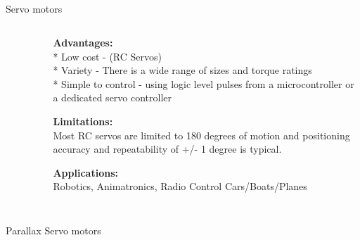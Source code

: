 \subsection{}
{
\begin{frame}{Servo motors}

\begin{columns}
\begin{column}{0.45\textwidth}  %

	\vspace{-3mm}
   	\begin{figure}
 	\end{figure}

\end{column}

\begin{column}{0.55\textwidth}

{\bf Advantages:} \\
* Low cost - (RC Servos) \\
* Variety - There is a wide range of sizes and torque ratings \\
* Simple to control - using logic level pulses from a microcontroller or a dedicated servo controller

{\bf Limitations:} \\
 Most RC servos are limited to 180 degrees of motion and positioning accuracy and repeatability of +/- 1 degree is typical.


{\bf Applications:} \\
Robotics,
Animatronics, 
Radio Control Cars/Boats/Planes



\end{column}
\end{columns}
\end{frame}
}



\subsection{}
{
\begin{frame}{Parallax Servo motors}

	\vspace{-3mm}
   	\begin{figure}
 	\end{figure}

\end{frame}
}





